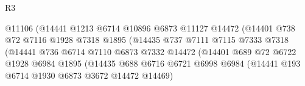 \begin{lexlean}{R3}
\begin{coremodule}
                                        @11106
                                        (@14441
                                          @1213
                                          @6714
                                          @10896
                                          @6873
                                          @11127
                                          @14472
                                          (@14401
                                            @738
                                            @72
                                            @7116
                                            @1928
                                            @7318
                                            @1895
                                            (@14435
                                              @737
                                              @7111
                                              @7115
                                              @7333
                                              @7318
                                              (@14441
                                                @736
                                                @6714
                                                @7110
                                                @6873
                                                @7332
                                                @14472
                                                (@14401
                                                  @689
                                                  @72
                                                  @6722
                                                  @1928
                                                  @6984
                                                  @1895
                                                  (@14435
                                                    @688
                                                    @6716
                                                    @6721
                                                    @6998
                                                    @6984
                                                    (@14441
                                                      @193
                                                      @6714
                                                      @1930
                                                      @6873
                                                      @3672
                                                      @14472
                                                      @14469)

\end{coremodule}
\end{lexlean}
